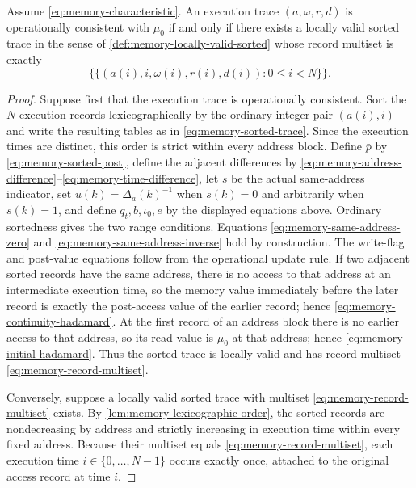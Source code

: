 \begin{theorem}
\label{thm:memory-sorted-characterization}
Assume \eqref{eq:memory-characteristic}.  An execution trace $(a,\omega,r,d)$ is operationally consistent with $\mu_0$ if and only if there exists a locally valid sorted trace in the sense of \cref{def:memory-locally-valid-sorted} whose record multiset is exactly
\begin{equation}
  \bigl\{\!\!\bigl\{
    (a(i),i,\omega(i),r(i),d(i)):
    0\le i<N
  \bigr\}\!\!\bigr\}.
  \label{eq:memory-record-multiset}
\end{equation}
\end{theorem}

\begin{proof}
Suppose first that the execution trace is operationally consistent.  Sort the $N$ execution records lexicographically by the ordinary integer pair $(a(i),i)$ and write the resulting tables as in \eqref{eq:memory-sorted-trace}.  Since the execution times are distinct, this order is strict within every address block.  Define $\bar p$ by \eqref{eq:memory-sorted-post}, define the adjacent differences by \eqref{eq:memory-address-difference}--\eqref{eq:memory-time-difference}, let $s$ be the actual same-address indicator, set $u(k)=\Delta_a(k)^{-1}$ when $s(k)=0$ and arbitrarily when $s(k)=1$, and define $q_t,b,\iota_0,e$ by the displayed equations above.  Ordinary sortedness gives the two range conditions.  Equations \eqref{eq:memory-same-address-zero} and \eqref{eq:memory-same-address-inverse} hold by construction.  The write-flag and post-value equations follow from the operational update rule.  If two adjacent sorted records have the same address, there is no access to that address at an intermediate execution time, so the memory value immediately before the later record is exactly the post-access value of the earlier record; hence \eqref{eq:memory-continuity-hadamard}.  At the first record of an address block there is no earlier access to that address, so its read value is $\mu_0$ at that address; hence \eqref{eq:memory-initial-hadamard}.  Thus the sorted trace is locally valid and has record multiset \eqref{eq:memory-record-multiset}.

Conversely, suppose a locally valid sorted trace with multiset \eqref{eq:memory-record-multiset} exists.  By \cref{lem:memory-lexicographic-order}, the sorted records are nondecreasing by address and strictly increasing in execution time within every fixed address.  Because their multiset equals \eqref{eq:memory-record-multiset}, each execution time $i\in\{0,\ldots,N-1\}$ occurs exactly once, attached to the original access record at time $i$.


\end{proof}
